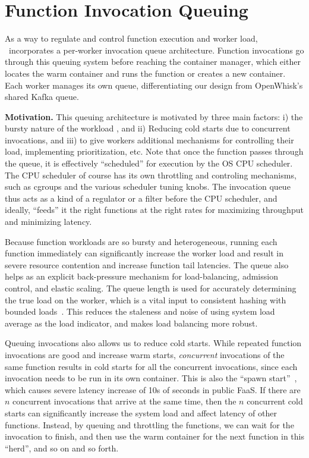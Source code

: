 \section{Function Invocation Queuing}
\label{sec:q}

As a way to regulate and control function execution and worker load, \sysname~incorporates a per-worker invocation queue architecture. 
Function invocations go through this queuing system before reaching the container manager, which either locates the warm container and runs the function or creates a new container.
Each worker manages its own queue, differentiating our design from OpenWhisk's shared Kafka queue. 

\noindent \textbf{Motivation.}
%
This queuing architecture is motivated by three main factors: i) the bursty nature of the workload , and ii) Reducing cold starts due to concurrent invocations, and iii) to give workers additional mechanisms for controlling their load, implementing prioritization, etc. 
Note that once the function passes through the queue, it is effectively ``scheduled'' for execution by the OS CPU scheduler.
The CPU scheduler of course has its own throttling and controling mechanisms, such as cgroups and the various scheduler tuning knobs.
The invocation queue thus acts as a kind of a regulator or a filter before the CPU scheduler, and ideally, ``feeds'' it the right functions at the right rates for maximizing throughput and minimizing latency.
%

Because function workloads are so bursty and heterogeneous, running each function immediately can significantly increase the worker load and result in severe resource contention and increase  function tail latencies.
%
The queue also helps as an explicit back-pressure mechanism for load-balancing, admission control, and elastic scaling.
The queue length is  used for accurately determining the true load on the worker, which is a vital input to consistent hashing with bounded loads~\cite{faaslb-hpdc22}.
This reduces the staleness and noise of using system load average as the load indicator, and makes load balancing more robust.


Queuing invocations also allows us to reduce cold starts.
While repeated function invocations are good and increase warm starts, 
\emph{concurrent} invocations of the same function results in cold starts for all the concurrent invocations, since each invocation needs to be run in its own container.
This is also the ``spawn start''~\cite{ristov_colder_warmer}, which causes severe latency increase of 10s of  seconds in public FaaS. 
If there are $n$ concurrent invocations that arrive at the same time, then the $n$ concurrent cold starts can significantly increase the system load and affect latency of other functions.
Instead, by queuing and throttling the functions, we can wait for the invocation to finish, and then use the warm container for the next function in this ``herd'', and so on and so forth. %

